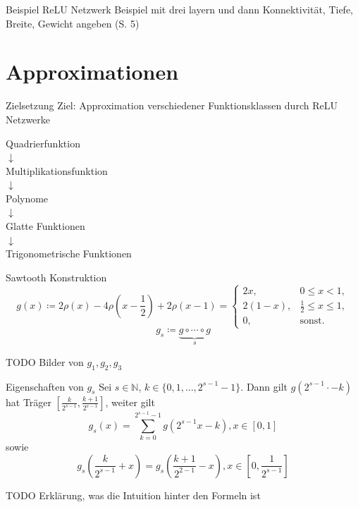 \documentclass[10pt,aspectratio=169]{beamer}
\newcommand{\N}{\mathbb{N}} %
\newcommand{\set}[1]{\{#1\}}
\begin{document}
\begin{frame}{Beispiel ReLU Netzwerk}
    Beispiel mit drei layern und dann Konnektivität, Tiefe, Breite, Gewicht angeben (S. 5)
\end{frame}

\section{Approximationen}

\begin{frame}{Zielsetzung}
    Ziel: Approximation verschiedener Funktionsklassen durch ReLU Netzwerke

    \begin{center}
        Quadrierfunktion \\ \pause
        \(\downarrow\) \\
        Multiplikationsfunktion \\ \pause
        \(\downarrow\) \\
        Polynome \\ \pause
        \(\downarrow\) \\
        Glatte Funktionen \\ \pause
        \(\downarrow\) \\
        Trigonometrische Funktionen
    \end{center}
\end{frame}

\begin{frame}{Sawtooth Konstruktion}
    \[g(x) \coloneqq 2\rho(x) - 4 \rho(x - \frac{1}{2}) + 2\rho(x-1) = \begin{cases}
        2x, & 0\leq x < 1, \\ 
        2(1-x), & \frac{1}{2} \leq x \leq 1, \\
        0, & \text{sonst.}
    \end{cases}\]
    \[g_s \coloneqq \underbrace{g \circ \cdots \circ g}_s \]

    TODO Bilder von \(g_1, g_2, g_3\)
\end{frame}

\begin{frame}{Eigenschaften von \(g_s\)}
    Sei \(s\in\N\), \(k \in \set{0,1,\ldots, 2^{s-1}-1}\). Dann gilt \(g(2^{s-1} \cdot - k)\) 
    hat Träger \([\frac{k}{2^{s-1}}, \frac{k+1}{2^{s-1}}]\), weiter gilt 
    \[ g_s(x) = \sum_{k=0}^{2^{s-1}-1} g(2^{s-1}x - k), x\in [0,1] \]
    sowie 
    \[ g_s(\frac{k}{2^{s-1}}+x) = g_s(\frac{k+1}{2^{2-1}} - x), x \in [0, \frac{1}{2^{s-1}}] \]

    TODO Erklärung, was die Intuition hinter den Formeln ist
\end{frame}
\end{document}
